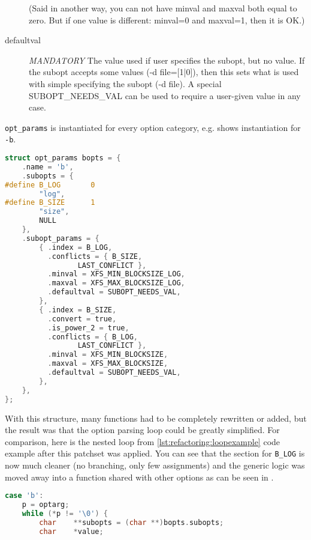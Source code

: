\begin{desciption}
\begin{description}
    (Said in another way, you can not have minval and maxval both equal
    to zero. But if one value is different: minval=0 and maxval=1,
    then it is OK.)

\item[defaultval] {\em MANDATORY}
    The value used if user specifies the subopt, but no value.
    If the subopt accepts some values (-d file=[1|0]), then this
    sets what is used with simple specifying the subopt (-d file).
    A special SUBOPT\_NEEDS\_VAL can be used to require a user-given
    value in any case.
		
\end{description}

{\tt opt\_params} is instantiated for every option category, e.g.
 shows instantiation for {\tt
-b}.

\begin{lstlisting}[frame=none, basicstyle=\footnotesize\ttfamily,
language=C, numbers=none, numberstyle=\tiny\color{black},
caption= {Instantiation of the table for block options.},
label={lst:refactoring:instantiation}]
struct opt_params bopts = {
	.name = 'b',
	.subopts = {
#define	B_LOG		0
		"log",
#define	B_SIZE		1
		"size",
		NULL
	},
	.subopt_params = {
		{ .index = B_LOG,
		  .conflicts = { B_SIZE,
				 LAST_CONFLICT },
		  .minval = XFS_MIN_BLOCKSIZE_LOG,
		  .maxval = XFS_MAX_BLOCKSIZE_LOG,
		  .defaultval = SUBOPT_NEEDS_VAL,
		},
		{ .index = B_SIZE,
		  .convert = true,
		  .is_power_2 = true,
		  .conflicts = { B_LOG,
				 LAST_CONFLICT },
		  .minval = XFS_MIN_BLOCKSIZE,
		  .maxval = XFS_MAX_BLOCKSIZE,
		  .defaultval = SUBOPT_NEEDS_VAL,
		},
	},
};
\end{lstlisting}

With this structure, many functions had to be completely rewritten or
added, but the result was that the option parsing loop could be greatly
simplified. For comparison, here is the nested loop from
\ref{lst:refactoring:loopexample} code example after this patchset was
applied. You can see that the section for {\tt B\_LOG} is now much cleaner
(no branching, only few assignments) and the generic logic was moved away
into a function shared with other options as can be seen in
.

\begin{lstlisting}[frame=none, basicstyle=\footnotesize\ttfamily,
language=C, numbers=none, numberstyle=\tiny\color{black},
caption= {Part of option-parsing loop from mkfs.xfs after the first patch
set.},
label={lst:refactoring:parsingAfterFirst}]
case 'b':
	p = optarg;
	while (*p != '\0') {
		char	**subopts = (char **)bopts.subopts;
		char	*value;


\end{lstlisting}
\end{desciption}
